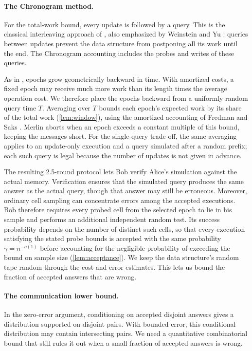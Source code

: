 \documentclass[11pt]{article}
\theoremstyle{plain}
\begin{document}
\paragraph{The Chronogram method.}
For the total-work bound, every update is followed by a query. This is the classical interleaving approach of \cite{fredman_cell_1989}, also emphasized by Weinstein and Yu \cite{weinstein_amortized_2016}: queries between updates prevent the data structure from postponing all its work until the end. The Chronogram accounting includes the probes and writes of these queries.

As in \cite{ko_omega_2026}, epochs grow geometrically backward in time. With amortized costs, a fixed epoch may receive much more work than its length times the average operation cost. We therefore place the epochs backward from a uniformly random query time $T$. Averaging over $T$ bounds each epoch's expected work by its share of the total work (\cref{lem:window}), using the amortized accounting of Fredman and Saks \cite[Section~4]{fredman_cell_1989}. Merlin aborts when an epoch exceeds a constant multiple of this bound, keeping the messages short. For the single-query trade-off, the same averaging applies to an update-only execution and a query simulated after a random prefix; each such query is legal because the number of updates is not given in advance.

The resulting 2.5-round protocol lets Bob verify Alice's simulation against the actual memory. Verification ensures that the simulated query produces the same answer as the actual query, though that answer may still be erroneous. Moreover, ordinary cell sampling can concentrate errors among the accepted executions. Bob therefore requires every probed cell from the selected epoch to lie in his sample and performs an additional independent random test. Its success probability depends on the number of distinct such cells, so that every execution satisfying the stated probe bounds is accepted with the same probability $\gamma=n^{-o(1)}$ before accounting for the negligible probability of exceeding the bound on sample size (\cref{lem:acceptance}). We keep the data structure's random tape random through the cost and error estimates. This lets us bound the fraction of accepted answers that are wrong.

\paragraph{The communication lower bound.}
In the zero-error argument, conditioning on accepted disjoint answers gives a distribution supported on disjoint pairs. With bounded error, this conditional distribution may contain intersecting pairs. We need a quantitative combinatorial bound that still rules it out when a small fraction of accepted answers is wrong.
\end{document}
